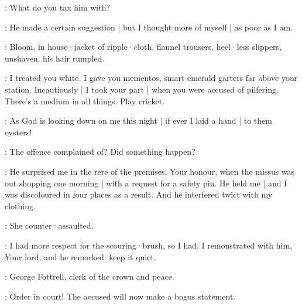 \FirstWatch:
What do you tax him with?

\Driscoll:
He made a certain suggestion |
but I thought more of myself |
as poor as I am.

:
Bloom,
in house·jacket of ripple·cloth,
flannel trousers,
heel·less slippers,
unshaven,
his hair rumpled.

\Bloom:
I treated you white.
I gave you mementos,
smart emerald garters far above your station.
Incautiously |
I took your part |
when you were accused of pilfering.
There's a medium in all things.
Play cricket.

\Driscoll:
As God is looking down on me this night |
if ever I laid a hand |
to them oysters!

\FirstWatch:
The offence complained of?
Did something happen?

\Driscoll:
He surprised me in the rere of the premises,
Your honour,
when the missus was out shopping one morning |
with a request for a safety pin.
He held me |
and I was discoloured in four places as a result.
And he interfered twict with my clothing.

\Bloom:
She counter·assaulted.

\Driscoll:
I had more respect for the scouring·brush,
so I had.
I remonstrated with him,
Your lord,
and he remarked:
keep it quiet.


:
George Fottrell,
clerk of the crown and peace.

\Fottrell:
Order in court!
The accused will now make a bogus statement.

